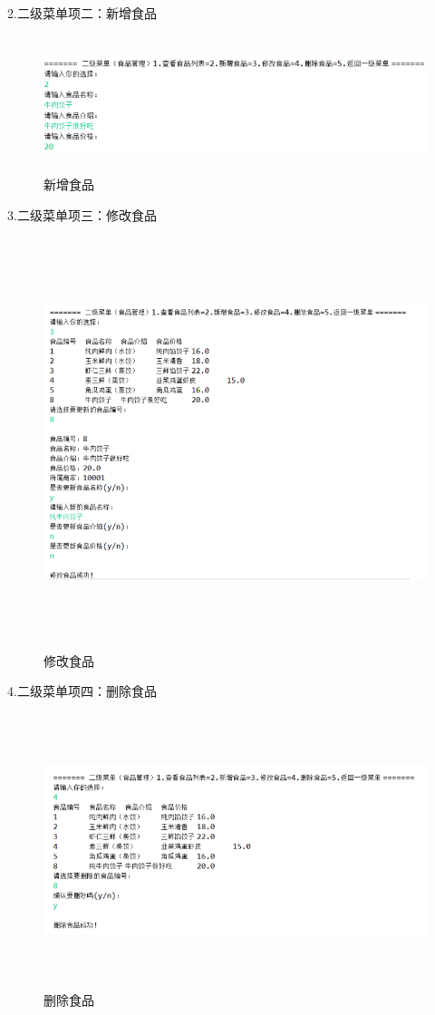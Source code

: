 \noindent
2.二级菜单项二：新增食品

\begin{figure}[H]
    \centering
    \includegraphics[width=15cm,height=4cm]{figures/jdbc12.png}
    \caption{新增食品}
\end{figure}

\noindent
3.二级菜单项三：修改食品

\begin{figure}[H]
    \centering
    \includegraphics[width=15cm,height=12cm]{figures/jdbc13.png}
    \caption{修改食品}
\end{figure}

\noindent
4.二级菜单项四：删除食品

\begin{figure}[H]
    \centering
    \includegraphics[width=15cm,height=8cm]{figures/jdbc14.png}
    \caption{删除食品}
\end{figure}


